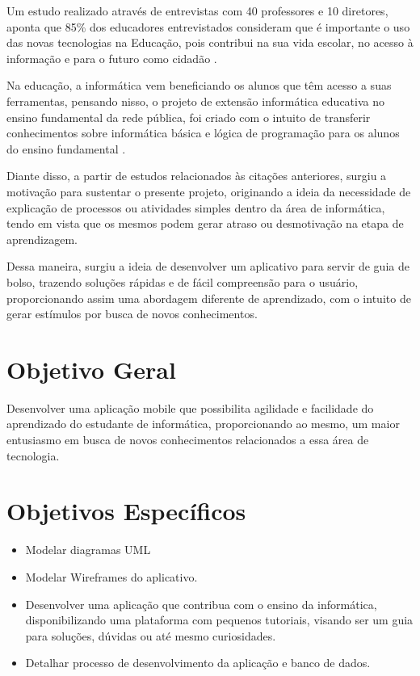 Um estudo realizado através de entrevistas com 40 professores e 10 diretores, aponta que 85\% dos educadores entrevistados consideram que é importante o uso das novas tecnologias na Educação, pois contribui na sua vida escolar, no acesso à informação e para o futuro como cidadão \cite{de2017informatica}.

Na educação, a informática vem beneficiando os alunos que têm acesso a suas ferramentas, pensando nisso, o projeto de extensão informática educativa no ensino fundamental da rede pública, foi criado com o intuito de transferir conhecimentos sobre informática básica e lógica de programação para os alunos do ensino fundamental \cite{alves2019analise}.

Diante disso, a partir de estudos relacionados às citações anteriores, surgiu a motivação para sustentar o presente projeto, originando a ideia da necessidade de explicação de processos ou atividades simples dentro da área de informática, tendo em vista que os mesmos podem gerar atraso ou desmotivação na etapa de aprendizagem.

Dessa maneira, surgiu a ideia de desenvolver um aplicativo para servir de guia de bolso, trazendo soluções rápidas e de fácil compreensão para o usuário, proporcionando assim uma abordagem diferente de aprendizado, com o intuito de gerar estímulos por busca de novos conhecimentos.


\section{Objetivo Geral}
\label{sec:objetivoGeral}

Desenvolver uma aplicação mobile que possibilita agilidade e facilidade do aprendizado do estudante de informática, proporcionando ao mesmo, um maior entusiasmo em busca de novos conhecimentos relacionados a essa área de tecnologia.

\section{Objetivos Específicos}
\label{sec:objetivosEspecificos}

\begin{itemize}
    \item Modelar diagramas UML
    \item Modelar Wireframes do aplicativo.
    \item Desenvolver uma aplicação que contribua com o ensino da informática, disponibilizando uma plataforma com pequenos tutoriais, visando ser um guia para soluções, dúvidas ou até mesmo curiosidades.
    \item Detalhar processo de desenvolvimento da aplicação e banco de dados.

    
\end{itemize}

